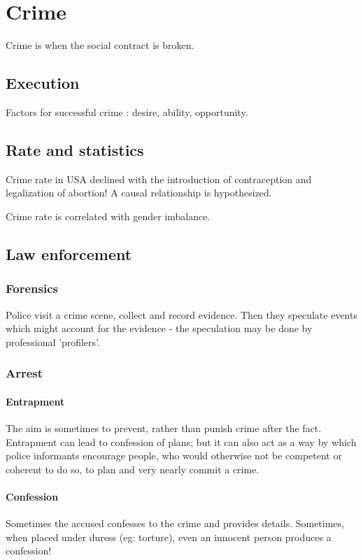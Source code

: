 \documentclass[oneside, article]{memoir}
\begin{document}
\chapter{Crime}
Crime is when the social contract is broken.

\section{Execution}
Factors for successful crime : desire, ability, opportunity.

\section{Rate and statistics}
Crime rate in USA declined with the introduction of contraception and legalization of abortion! A causal relationship is hypothesized.

Crime rate is correlated with gender imbalance.

\section{Law enforcement}
\subsection{Forensics}
Police visit a crime scene, collect and record evidence. Then they speculate events which might account for the evidence - the speculation may be done by professional 'profilers'.

\subsection{Arrest}
\subsubsection{Entrapment}
The aim is sometimes to prevent, rather than punish crime after the fact. Entrapment can lead to confession of plans; but it can also act as a way by which police informants encourage people, who would otherwise not be competent or coherent to do so, to plan and very nearly commit a crime.

\subsubsection{Confession}
Sometimes the accused confesses to the crime and provides details. Sometimes, when placed under duress (eg: torture), even an innocent person produces a confession!
\end{document}
